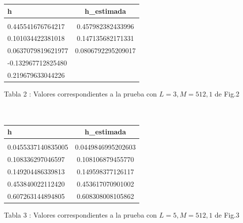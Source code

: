 \documentclass[10pt,journal,compsoc]{IEEEtran}
\begin{document}
\begin{tabular}{l c}
\hline\hline
h &  h\_estimada\\
\hline \\

0.445541676764217 & 0.457982382433996\\
0.101034422381018 & 0.147135682171331\\
0.0637079819621977 & 0.0806792295209017\\
-0.132967712825480 \\
0.219679633044226\\



\hline\hline

\end{tabular}
 
Tabla 2 : Valores correspondientes a la prueba con $L=3 , M=512, 1$ de Fig.2 \\ \\ \\

\begin{tabular}{l c}
\hline\hline
h &  h\_estimada\\
\hline \\

0.0455337140835005 & 0.0449846995202603\\
0.108336297046597 & 0.108106879455770\\
0.149204486339813 & 0.149598377126117\\
0.453840022112420 & 0.453617070901002\\
0.607263144894805 & 0.608308008105862\\




\hline\hline

\end{tabular}
 
Tabla 3 : Valores correspondientes a la prueba con $L=5 , M=512, 1$ de Fig.3
\end{document}
